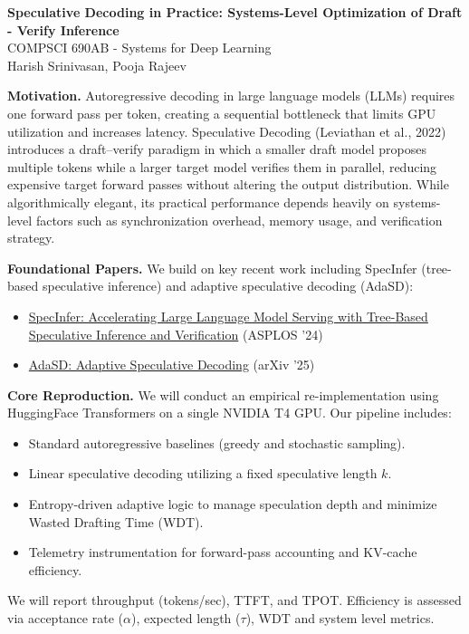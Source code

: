 \documentclass[11pt]{article}
\begin{document}
\begin{center}
{\Large \textbf{Speculative Decoding in Practice: Systems-Level Optimization of Draft - Verify Inference}}\\[7pt]
COMPSCI 690AB - Systems for Deep Learning\\[4pt]
Harish Srinivasan, Pooja Rajeev
\end{center}

\noindent\textbf{Motivation.}
Autoregressive decoding in large language models (LLMs) requires one forward pass per token, creating a sequential bottleneck that limits GPU utilization and increases latency. Speculative Decoding (Leviathan et al., 2022) introduces a draft--verify paradigm in which a smaller draft model proposes multiple tokens while a larger target model verifies them in parallel, reducing expensive target forward passes without altering the output distribution. While algorithmically elegant, its practical performance depends heavily on systems-level factors such as synchronization overhead, memory usage, and verification strategy.

\noindent\textbf{Foundational Papers.}
We build on key recent work including SpecInfer (tree-based speculative inference) and adaptive speculative decoding (AdaSD):
\begin{itemize}
    \item \href{https://arxiv.org/abs/2305.09781}{SpecInfer: Accelerating Large Language Model Serving with Tree-Based Speculative Inference and Verification} (ASPLOS ’24)
    \item \href{https://arxiv.org/abs/2512.11280}{AdaSD: Adaptive Speculative Decoding} (arXiv ’25)
\end{itemize}
\noindent\textbf{Core Reproduction.}
We will conduct an empirical re-implementation using HuggingFace Transformers on a single NVIDIA T4 GPU. Our pipeline includes:
\begin{itemize}
\item Standard autoregressive baselines (greedy and stochastic sampling).
\item Linear speculative decoding utilizing a fixed speculative length $k$.
\item Entropy-driven adaptive logic to manage speculation depth and minimize Wasted Drafting Time (WDT).
\item Telemetry instrumentation for forward-pass accounting and KV-cache efficiency.
\end{itemize}
We will report throughput (tokens/sec), TTFT, and TPOT. Efficiency is assessed via acceptance rate ($\alpha$), expected length ($\tau$), WDT and system level metrics.
\end{document}
